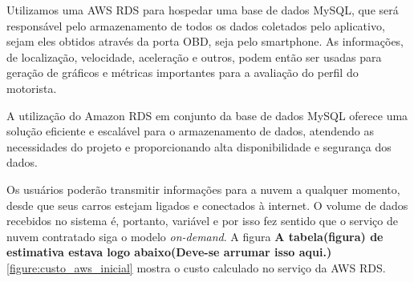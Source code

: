 Utilizamos uma AWS RDS para hospedar uma base de dados MySQL, que será responsável pelo armazenamento de todos os dados coletados pelo aplicativo, sejam eles obtidos através da porta OBD, seja pelo smartphone. As informações, de localização, velocidade, aceleração e outros, podem então ser usadas para geração de gráficos e métricas importantes para a avaliação do perfil do motorista.

A utilização do Amazon RDS em conjunto da base de dados MySQL oferece uma solução eficiente e escalável para o armazenamento de dados, atendendo as necessidades do projeto e proporcionando alta disponibilidade e segurança dos dados.




Os usuários poderão transmitir informações para a nuvem a qualquer momento, desde que seus carros estejam ligados e conectados à internet. O volume de dados recebidos no sistema é, portanto, variável e por isso fez sentido que o serviço de nuvem contratado siga o modelo \textit{on-demand}. A figura \textbf{A tabela(figura) de estimativa estava logo abaixo(Deve-se arrumar isso aqui.)}\ref{figure:custo_aws_inicial} mostra o custo calculado no serviço da AWS RDS.




